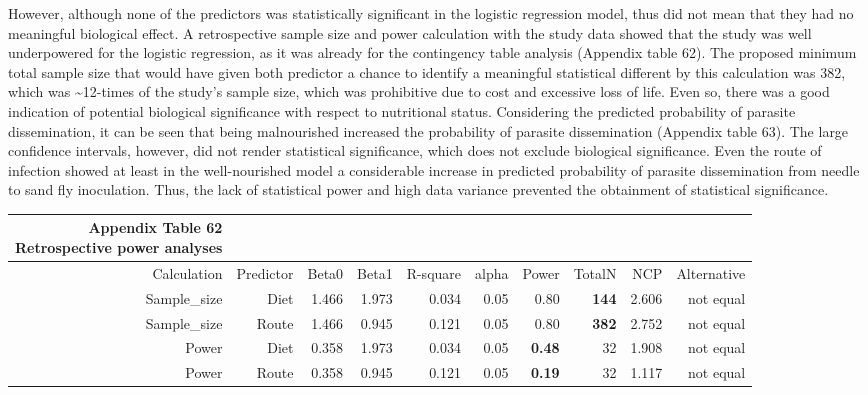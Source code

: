 \documentclass[
  12pt,
  letterpaper,
]{article}
\begin{document}
However, although none of the predictors was statistically significant in the logistic regression model, thus did not mean that they had no meaningful biological effect. A retrospective sample size and power calculation with the study data showed that the study was well underpowered for the logistic regression, as it was already for the contingency table analysis (Appendix table 62). The proposed minimum total sample size that would have given both predictor a chance to identify a meaningful statistical different by this calculation was 382, which was \textasciitilde12-times of the study's sample size, which was prohibitive due to cost and excessive loss of life. Even so, there was a good indication of potential biological significance with respect to nutritional status. Considering the predicted probability of parasite dissemination, it can be seen that being malnourished increased the probability of parasite dissemination (Appendix table 63). The large confidence intervals, however, did not render statistical significance, which does not exclude biological significance. Even the route of infection showed at least in the well-nourished model a considerable increase in predicted probability of parasite dissemination from needle to sand fly inoculation. Thus, the lack of statistical power and high data variance prevented the obtainment of statistical significance.

\begingroup
\fontsize{12.0pt}{14.4pt}\selectfont
\begin{longtable}{rrrrrrrrrr}
\caption*{
{\large \textbf{Appendix Table 62}} \\ 
{\small \textbf{Retrospective power analyses}}
} \\ 
\toprule
{Calculation} & {Predictor} & {Beta0} & {Beta1} & {R-square} & {alpha} & {Power} & {TotalN} & {NCP} & {Alternative} \\ 
\midrule\addlinespace[2.5pt]
Sample\_size & Diet & 1.466 & 1.973 & 0.034 & 0.05 & 0.80 & {\bfseries 144} & 2.606 & not equal \\ 
Sample\_size & Route & 1.466 & 0.945 & 0.121 & 0.05 & 0.80 & {\bfseries 382} & 2.752 & not equal \\ 
Power & Diet & 0.358 & 1.973 & 0.034 & 0.05 & {\bfseries 0.48} & 32 & 1.908 & not equal \\ 
Power & Route & 0.358 & 0.945 & 0.121 & 0.05 & {\bfseries 0.19} & 32 & 1.117 & not equal \\ 
\bottomrule
\end{longtable}
\endgroup
\end{document}
